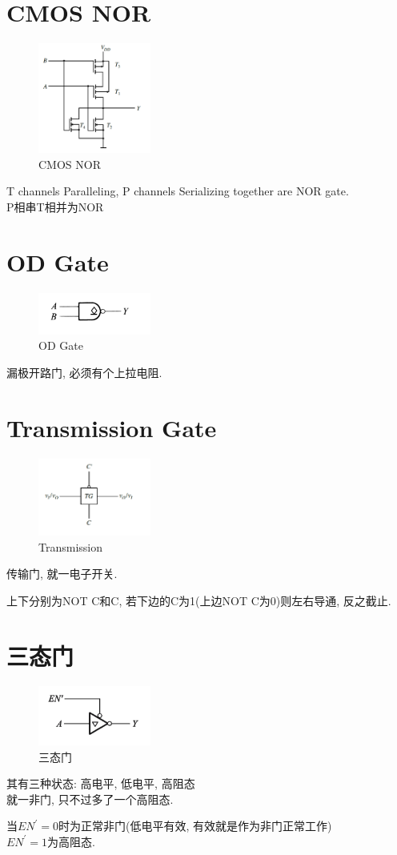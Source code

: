\documentclass[scheme=chinese,a4paper]{report}
\begin{document}
\section{CMOS NOR}
\begin{figure}[H]
    \centering
    \includegraphics[width=0.33\textwidth]{cmos_nor.png}
    \caption{CMOS NOR}
    \end{figure}
T channels Paralleling, P channels Serializing together are NOR gate. \\
P相串T相并为NOR
\section{OD Gate}
\begin{figure}[H]
\centering
\includegraphics[width=0.33\textwidth]{cmos_od.png}
\caption{OD Gate}
\end{figure}
漏极开路门, 必须有个上拉电阻. 
\section{Transmission Gate}
\begin{figure}[H]
\centering
\includegraphics[width=0.33\textwidth]{cmos_tranmission.png}
\caption{Transmission}
\end{figure}
传输门, 就一电子开关. \par
上下分别为NOT C和C, 若下边的C为1(上边NOT C为0)则左右导通, 反之截止. 
\section{三态门}
\begin{figure}[H]
\centering
\includegraphics[width=0.33\textwidth]{cmos_tri_condition.png}
\caption{三态门}
\end{figure}
其有三种状态: 高电平, 低电平, 高阻态\\
就一非门, 只不过多了一个高阻态. 
\par
当$EN^\prime=0$时为正常非门(低电平有效, 有效就是作为非门正常工作)\\
$EN^\prime=1$为高阻态.
\end{document}
